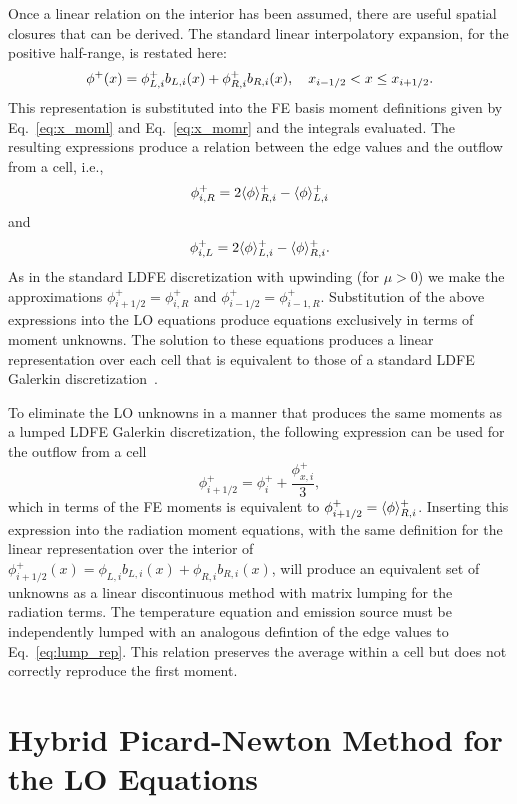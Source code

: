 Once a linear relation on the interior has been assumed, there are useful spatial closures that can be
derived.  The standard linear interpolatory expansion, for the positive half-range, is restated here:
\begin{equation}
\phi^+(x) = \phi^+_{L,i} b_{L,i}(x) + \phi^+_{R,i} b_{R,i}(x), \quad {x_{i-1/2}} < x \leq {x_{i+1/2}}.
\end{equation}
This representation is substituted into the FE basis moment definitions given by
Eq.~\eqref{eq:x_moml} and Eq.~\eqref{eq:x_momr} and the integrals evaluated.  The
resulting expressions produce a relation between the edge values and the outflow from a
cell, i.e., 
\begin{equation}
    \phi_{i,R}^+ = 2 \langle \phi \rangle_{R,i}^+ - \langle \phi \rangle_{L,i}^+
\end{equation}
and
\begin{equation}
    \phi_{i,L}^+ = 2 \langle \phi \rangle_{L,i}^+ - \langle \phi \rangle_{R,i}^+.
\end{equation}
As in the standard LDFE discretization with upwinding (for $\mu>0$) we make the
approximations $\phi_{i+1/2}^+=\phi_{i,R}^+$ and $\phi_{i-1/2}^+=\phi_{i-1,R}^+$. Substitution
of the above expressions into the LO equations produce
equations exclusively in terms of moment unknowns.  The solution to these equations produces a linear
representation over each cell that is equivalent to those of a standard LDFE Galerkin
discretization~\cite{fem_book}.

To eliminate the LO unknowns in a manner that produces the same moments as a lumped LDFE
Galerkin discretization, the
following expression can be used for the outflow from a cell
\begin{equation}\label{eq:lump_rep}
    \phi_{i+1/2}^+ = \phi_i^+ + \frac{\phi_{x,i}^+}{3},
\end{equation}
which in terms of the FE moments is equivalent to $\phi_{i+1/2}^+ =
\langle \phi \rangle_{R,i}^+$.  Inserting this expression into the radiation moment equations, with the same
definition for the linear representation over the interior of $\phi_{i+1/2}^+(x) =
\phi_{L,i} b_{L,i}(x) + \phi_{R,i} b_{R,i}(x)$, will produce an equivalent set of unknowns
as a linear discontinuous method with matrix lumping for the radiation terms.  The
temperature equation and emission source must be independently lumped with an analogous
defintion of the edge values to Eq.~\eqref{eq:lump_rep}. This
relation preserves the average within a cell but does not correctly reproduce the first moment.  

\section{Hybrid Picard-Newton Method for the LO Equations}
\label{app:lo_newton}

